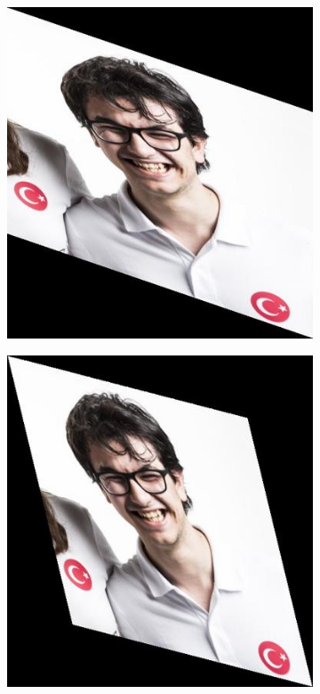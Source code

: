 \documentclass{article}
\begin{document}
\begin{figure}[!htb]
\begin{subfigure}{.25\textwidth}
\end{subfigure}
\begin{subfigure}{.25\textwidth}
  \centering
  \includegraphics[width=.99\textwidth]{ahmet2.jpg}
\end{subfigure}
\begin{subfigure}{.25\textwidth}
  \centering
  \includegraphics[width=.99\textwidth]{ahmet3.jpg}

\end{subfigure}
\end{figure}
\end{document}
